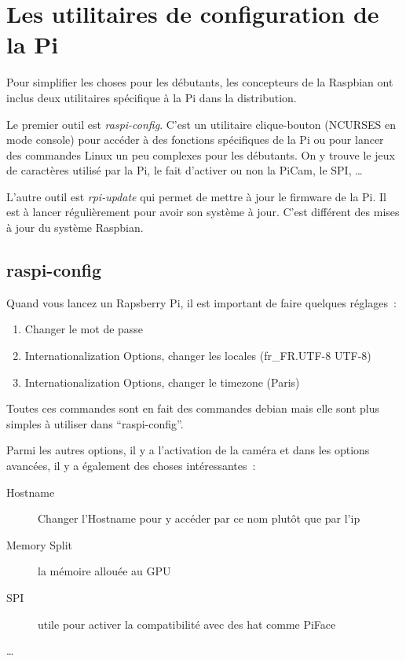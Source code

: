 \section{Les utilitaires de configuration de la Pi}

Pour simplifier les choses pour les débutants, les concepteurs de la Raspbian ont inclus deux utilitaires spécifique à la Pi dans la distribution.

Le premier outil est \emph{raspi-config}. C'est un utilitaire clique-bouton (NCURSES en mode console) pour accéder à des fonctions spécifiques de la Pi ou pour lancer des commandes Linux un peu complexes pour les débutants. On y trouve le jeux de caractères utilisé par la Pi, le fait d'activer ou non la PiCam, le SPI, \dots

L'autre outil est \emph{rpi-update} qui permet de mettre à jour le firmware de la Pi. Il est à lancer régulièrement pour avoir son système à jour.  C'est différent des mises à jour du système Raspbian.

\subsection{raspi-config}

Quand vous lancez un Rapsberry Pi, il est important de faire quelques réglages~:
\begin{enumerate}
	\item Changer le mot de passe
	\item Internationalization Options, changer les locales (fr\_FR.UTF-8 UTF-8)
	\item Internationalization Options, changer le timezone (Paris)
\end{enumerate}

Toutes ces commandes sont en fait des commandes debian mais elle sont plus simples à utiliser dans ``raspi-config''.

Parmi les autres options, il y a l'activation de la caméra et dans les options avancées, il y a également des choses intéressantes~:
\begin{description}
	\item[Hostname] Changer l'Hostname pour y accéder par ce nom plutôt que par l'ip
	\item[Memory Split] la mémoire allouée au GPU
	\item[SPI] utile pour activer la compatibilité avec des hat comme PiFace
	\item[\dots]
\end{description}

